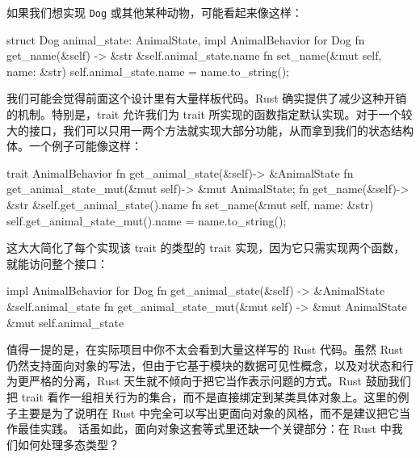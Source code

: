\label{idx:idx_b7036c75}
如果我们想实现 \texttt{Dog} 或其他某种动物，可能看起来像这样：
\begin{codebox}[rust]
struct Dog {
      animal_state: AnimalState,
}
impl AnimalBehavior for Dog {
      fn get_name(&self) -> &str {
            &self.animal_state.name
      }
      fn set_name(&mut self, name: &str) {
            self.animal_state.name = name.to_string();
      }
}
\end{codebox}
我们可能会觉得前面这个设计里有大量样板代码。Rust 确实提供了减少这种开销的机制。特别是，trait 允许我们为 trait 所实现的函数指定默认实现。对于一个较大的接口，我们可以只用一两个方法就实现大部分功能，从而拿到我们的状态结构体。一个例子可能像这样：
\begin{codebox}[rust]
trait AnimalBehavior {
      fn get_animal_state(&self)-> &AnimalState
      fn get_animal_state_mut(&mut self)-> &mut AnimalState;
      fn get_name(&self)-> &str {
            &self.get_animal_state().name
      }
      fn set_name(&mut self, name: &str) {
            self.get_animal_state_mut().name = name.to_string();
      }
}
\end{codebox}
\label{idx:idx_84b1d48d}
这大大简化了每个实现该 trait 的类型的 trait 实现，因为它只需实现两个函数，就能访问整个接口：
\begin{codebox}[rust]
impl AnimalBehavior for Dog {
      fn get_animal_state(&self) -> &AnimalState {
            &self.animal_state
      }
      fn get_animal_state_mut(&mut self) -> &mut AnimalState {
            &mut self.animal_state
      }
}
\end{codebox}
\label{idx:idx_f71ce817}
值得一提的是，在实际项目中你不太会看到大量这样写的 Rust 代码。虽然 Rust 仍然支持面向对象的写法，但由于它基于模块的数据可见性概念，以及对状态和行为更严格的分离，Rust 天生就不倾向于把它当作表示问题的方式。Rust 鼓励我们把 trait 看作一组相关行为的集合，而不是直接绑定到某类具体对象上。这里的例子主要是为了说明在 Rust 中完全可以写出更面向对象的风格，而不是建议把它当作最佳实践。
话虽如此，面向对象这套等式里还缺一个关键部分：在 Rust 中我们如何处理多态类型？
